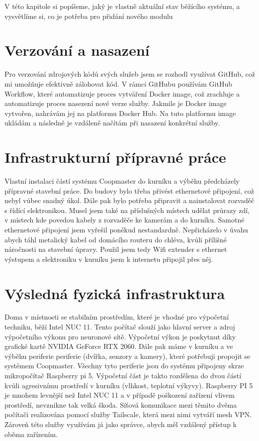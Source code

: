 V této kapitole si popíšeme, jaký je vlastně aktuální stav běžícího systému, a vysvětlíme si, co je potřeba pro přidání nového modulu
\section*{Verzování a nasazení}

Pro verzování zdrojových kódů svých služeb jsem se rozhodl využívat GitHub, což mi umožňuje efektivně zálohovat kód.
V rámci GitHubu používám GitHub Workflow, které automatizuje proces vytváření Docker image, což zrachluje a automatizuje proces nasezení nové verze služby.
Jakmile je Docker image vytvořen, nahrávám jej na platformu Docker Hub.
Na tuto platformu image ukládám a následně je vzdáleně načítám při nasazení konkrétní služby.
\section*{Infrastrukturní přípravné práce}

Vlastní instalaci částí systému Coopmaster do kurníku a výběhu předcházely přípravné stavební práce.
Do budovy bylo třeba přivést ethernetové připojení, což nebyl vůbec snadný úkol.
Dále pak bylo potřeba připravit a nainstalovat rozvaděč s řídící elektronikou.
Musel jsem také na příslušných místech udělat průrazy zdí, v místech kde povedou kabely z rozvaděče ke kamerám a do kurníku.
Samotné ethernetové připojení jsem vyřešil poněkud nestandardně.
Nepřicházelo v úvahu abych táhl metalický kabel od domácího routeru do chléva, kvůli přílišné náročnosti na stavební úpravy.
Použil jsem tedy Wifi extender s ethernet výstupem a elektroniku v kurníku jsem k internetu připojil přes něj.
\section*{Výsledná fyzická infrastruktura}

Doma v místnosti se stabilním prostředím, které je vhodné pro výpočetní techniku, běží Intel NUC 11.
Tento počítač slouží jako hlavní server a zdroj výpočetního výkonu pro neuronové sítě.
Výpočetní výkon je poskytnut díky grafické kartě NVIDIA GeForce RTX 2060.\newline
Dále pak máme v kurníku a ve výběhu periferie periferie (dvířka, senzory a kamery), které potřebuji propojit se systémem Coopmaster.
Všechny tyto periferie jsou do systému připojeny skrze mikropočítač Raspberry pi 5.
Výpočetní část je takto rozdělena do dvou částí kvůli agresivnímu prostředí v kurníku (vlhkost, teplotní výkyvy).
Raspberry PI 5 je mnohem levnější než Intel NUC 11 a v případě poškození zařízení vlivem prostředí, nevznikne tak velká škoda.
Síťová komunikace mezi těmito dvěma počítači realizována pomocí služby Tailscale, která mezi nimi vytváří mesh VPN.
Zároveň této služby využívám já jako správce, abych měl vzdálený přístup k oběma zařízením.

